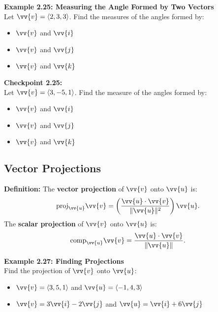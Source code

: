 \documentclass{article}
\begin{document}
\begin{examplebox}
    \textbf{Example 2.25: Measuring the Angle Formed by Two Vectors} \\
    Let \(\vv{v} = \langle 2, 3, 3 \rangle\). Find the measures of the angles formed by:
    \begin{itemize}
        \item \(\vv{v}\) and \(\vv{i}\)
        \item \(\vv{v}\) and \(\vv{j}\)
        \item \(\vv{v}\) and \(\vv{k}\)
    \end{itemize}
\end{examplebox}

\begin{exercisebox}
    \textbf{Checkpoint 2.25:} \\
    Let \(\vv{v} = \langle 3, -5, 1 \rangle\). Find the measure of the angles formed by:
    \begin{itemize}
        \item \(\vv{v}\) and \(\vv{i}\)
        \item \(\vv{v}\) and \(\vv{j}\)
        \item \(\vv{v}\) and \(\vv{k}\)
    \end{itemize}
\end{exercisebox}

\subsection*{Vector Projections}

\begin{definitionbox}
    \textbf{Definition:} The \textbf{vector projection} of \(\vv{v}\) onto \(\vv{u}\) is:
    \[
    \text{proj}_{\vv{u}} \vv{v} = \left( \frac{\vv{u} \cdot \vv{v}}{\|\vv{u}\|^2} \right) \vv{u}.
    \]
    The \textbf{scalar projection} of \(\vv{v}\) onto \(\vv{u}\) is:
    \[
    \text{comp}_{\vv{u}} \vv{v} = \frac{\vv{u} \cdot \vv{v}}{\|\vv{u}\|}.
    \]
\end{definitionbox}

\begin{examplebox}
    \textbf{Example 2.27: Finding Projections} \\
    Find the projection of \(\vv{v}\) onto \(\vv{u}\):
    \begin{itemize}
        \item \(\vv{v} = \langle 3, 5, 1 \rangle\) and \(\vv{u} = \langle -1, 4, 3 \rangle\)
        \item \(\vv{v} = 3\vv{i} - 2\vv{j}\) and \(\vv{u} = \vv{i} + 6\vv{j}\)
    \end{itemize}
\end{examplebox}
\end{document}
